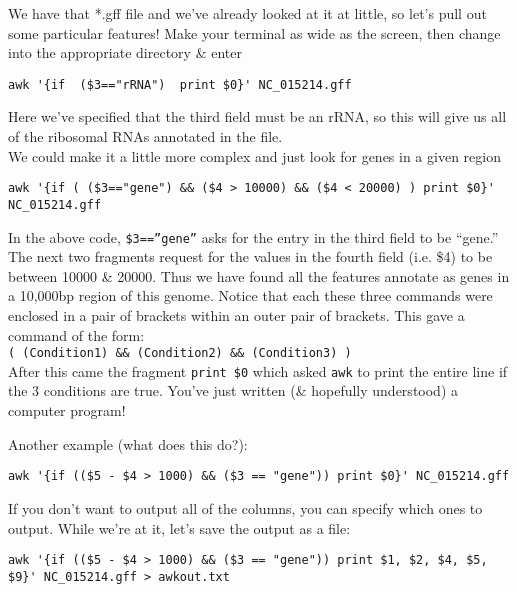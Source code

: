 \begin{steps}
We have that *.gff file and we've already looked at it at little, so let's pull out some particular features!
Make your terminal as wide as the screen, then change into the appropriate directory \& enter
\begin{lstlisting}
awk '{if  ($3=="rRNA")  print $0}' NC_015214.gff
\end{lstlisting}
Here we've specified that the third field must be an rRNA, so this will give us all of the ribosomal RNAs annotated in the file. \\

We could make it a little more complex and just look for genes in a given region
\begin{lstlisting}
awk '{if ( ($3=="gene") && ($4 > 10000) && ($4 < 20000) ) print $0}' NC_015214.gff
\end{lstlisting}
\end{steps}
\begin{note}
In the above code, \texttt{\$3==''gene''} asks for the entry in the third field to be ``gene.''
The next two fragments request for the values in the fourth field (i.e. \$4) to be between 10000 \& 20000.
Thus we have found all the features annotate as genes in a 10,000bp region of this genome.
Notice that each these three commands were enclosed in a pair of brackets within an outer pair of brackets.
This gave a command of the form: \\
\texttt{( (Condition1) \&\& (Condition2) \&\& (Condition3) )} \\
After this came the fragment \texttt{print \$0} which asked \texttt{awk} to print the entire line if the 3 conditions are true.
You've just written (\& hopefully understood) a computer program!
\end{note}

\begin{steps}
Another example (what does this do?): \\
\begin{lstlisting}
awk '{if (($5 - $4 > 1000) && ($3 == "gene")) print $0}' NC_015214.gff 
\end{lstlisting}
If you don't want to output all of the columns, you can specify which ones to output.  
While we're at it, let's save the output as a file: \\
\begin{lstlisting}
awk '{if (($5 - $4 > 1000) && ($3 == "gene")) print $1, $2, $4, $5, $9}' NC_015214.gff > awkout.txt
\end{lstlisting}
\end{steps}

